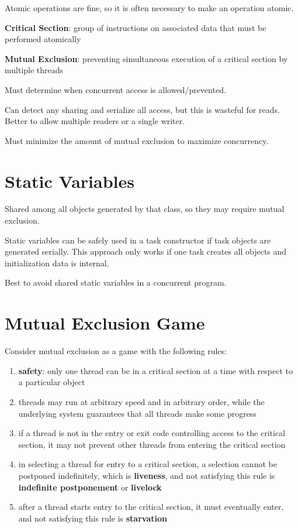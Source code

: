 \documentclass[11pt]{article}
\begin{document}
Atomic operations are fine, so it is often necessary to make an operation atomic.

\textbf{Critical Section}: group of instructions on associated data that must be performed atomically

\textbf{Mutual Exclusion}: preventing simultaneous execution of a critical section by multiple threads

Must determine when concurrent access is allowed/prevented.

Can detect any sharing and serialize all access, but this is wasteful for reads.
Better to allow multiple readers or a single writer.

Must minimize the amount of mutual exclusion to maximize concurrency.
\section{Static Variables}
\label{sec:org3cbbe65}
Shared among all objects generated by that class, so they may require mutual exclusion.

Static variables can be safely used in a task constructor if task objects are generated serially.
This approach only works if one task creates all objects and initialization data is internal.

Best to avoid shared static variables in a concurrent program.
\section{Mutual Exclusion Game}
\label{sec:org71e2810}
Consider mutual exclusion as a game with the following rules:
\begin{enumerate}
\item \textbf{safety}: only one thread can be in a critical section at a time with respect to a particular object
\item threads may run at arbitrary speed and in arbitrary order, while the underlying system guarantees
that all threads make some progress
\item if a thread is not in the entry or exit code controlling access to the critical section, it may not
prevent other threads from entering the critical section
\item in selecting a thread for entry  to a critical section, a selection cannot be postponed indefinitely,
which is \textbf{liveness}, and not satisfying this rule is \textbf{indefinite postponement} or \textbf{livelock}
\item after a thread starts entry to the critical section, it must eventually enter, and not satisfying this
rule is \textbf{starvation}
\end{enumerate}
\end{document}
